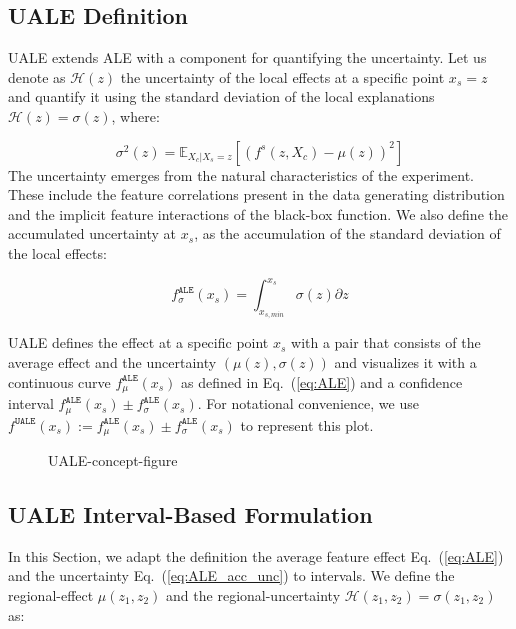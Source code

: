 \documentclass[twoside]{article}
\newcommand{\dfdx}{f^s}
\begin{document}
\subsection{UALE Definition}
\label{sec:UALE-definition-1}

UALE extends ALE with a component for quantifying the uncertainty. Let
us denote as \(\mathcal{H}(z)\) the uncertainty of the local effects
at a specific point \(x_s=z\) and quantify it using the standard
deviation of the local explanations \(\mathcal{H}(z) = \sigma(z)\),
where:

\begin{equation}
  \label{eq:ALE_var}
  \sigma^2(z) = \mathbb{E}_{X_c|X_s=z}\left [ \left (\dfdx (z, X_c) - \mu(z) \right )^2 \right ] 
\end{equation}
\noindent
The uncertainty emerges from the natural characteristics of the
experiment. These include the feature correlations present in the data
generating distribution and the implicit feature interactions of the
black-box function. We also define the accumulated uncertainty at
\(x_s\), as the accumulation of the standard deviation of the local
effects:

\begin{equation}
  \label{eq:ALE_acc_unc}
  f^{\mathtt{ALE}}_{\sigma}(x_s) = \int_{x_{s, min}}^{x_s} \sigma(z) \partial z
\end{equation}
\noindent

UALE defines the effect at a specific point \(x_s\) with a pair that
consists of the average effect and the uncertainty
\((\mu(z), \sigma(z))\) and visualizes it with a continuous curve
\(f^{\mathtt{ALE}}_{\mu}(x_s) \) as defined in Eq.~(\ref{eq:ALE}) and
a confidence interval
\(f^{\mathtt{ALE}}_{\mu}(x_s) \pm
f^{\mathtt{ALE}}_{\sigma}(x_s)\). For notational convenience, we use
\(f^{\mathtt{UALE}}(x_s) := f^{\mathtt{ALE}}_{\mu}(x_s) \pm
f^{\mathtt{ALE}}_{\sigma}(x_s)\) to represent this plot.

\begin{figure}
  \centering
  
  \caption{UALE-concept-figure}
  \label{fig:UALE-figure}
\end{figure}

\subsection{UALE Interval-Based Formulation}
\label{sec:UALE-definition-2}

In this Section, we adapt the definition the average feature effect
Eq.~(\ref{eq:ALE}) and the uncertainty Eq.~(\ref{eq:ALE_acc_unc}) to
intervals. We define the regional-effect \(\mu(z_1, z_2)\) and the
regional-uncertainty \(\mathcal{H}(z_1, z_2) = \sigma(z_1, z_2)\) as:
\end{document}
